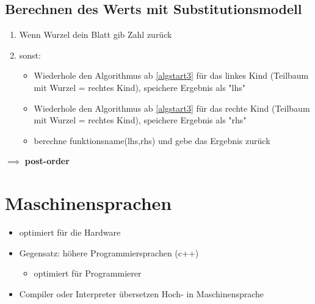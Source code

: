 \documentclass[a4paper]{scrartcl}
\theoremstyle{definition}
\theoremstyle{plain}
\theoremstyle{remark}
\theoremstyle{remark}
\begin{document}
\subsection{Berechnen des Werts mit Substitutionsmodell}
\label{sec-4-6}
\begin{enumerate}
\item \label{algstart3} Wenn Wurzel dein Blatt gib Zahl zurück
\item sonst:
\begin{itemize}
\item Wiederhole den Algorithmus ab \ref{algstart3} für das linkes Kind (Teilbaum mit Wurzel = rechtes Kind), speichere Ergebnis als "lhs"
\item Wiederhole den Algorithmus ab \ref{algstart3} für das rechte Kind (Teilbaum mit Wurzel = rechtes Kind), speichere Ergebnis als "rhs"
\item berechne funktionsname(lhs,rhs) und gebe das Ergebnis zurück
\end{itemize}
\end{enumerate}
$\implies$ \textbf{post-order}
\section{Maschinensprachen}
\label{sec-5}
\begin{itemize}
\item optimiert für die Hardware
\item Gegensatz: höhere Programmiersprachen (c++)
\begin{itemize}
\item optimiert für Programmierer
\end{itemize}
\item Compiler oder Interpreter übersetzen Hoch- in Maschinensprache
\end{itemize}
\end{document}
